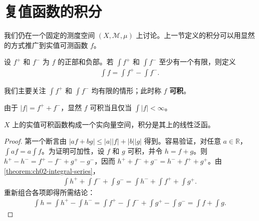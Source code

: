 \documentclass[../../main.tex]{subfiles}%
\begin{document}
\section{复值函数的积分}\label{section:ch02-complex-integration}
我们仍在一个固定的测度空间 $(X,\mathscr{M},\mu)$ 上讨论。上一节定义的积分可以用显然的方式推广到实值可测函数 $f$。
\begin{definition}[实值函数的积分]\label{definition:ch02-real-integral}
设 $f^+$ 和 $f^-$ 为 $f$ 的正部和负部。若 $\int f^+$ 和 $\int f^-$ 至少有一个有限，则定义
\begin{align*}
\int f=\int f^+-\int f^-.
\end{align*}
\end{definition}
\begin{definition}[实值可积函数]\label{definition:ch02-real-integrable}
我们主要关注 $\int f^+$ 和 $\int f^-$ 均有限的情形；此时称 $f$ \textbf{可积}。
\end{definition}
\begin{remark}
由于 $|f|=f^++f^-$，显然 $f$ 可积当且仅当 $\int|f|<\infty$。
\end{remark}
\begin{proposition}\label{proposition:ch02-real-integral-linearity}
$X$ 上的实值可积函数构成一个实向量空间，积分是其上的线性泛函。
\end{proposition}
\begin{proof}
第一个断言由 $|af+bg|\le|a||f|+|b||g|$ 得到。容易验证，对任意 $a\in\mathbb{R}$，$\int af=a\int f$。为证明可加性，设 $f$ 和 $g$ 可积，并令 $h=f+g$。则 $h^+-h^-=f^+-f^-+g^+-g^-$，因而 $h^++f^-+g^-=h^-+f^++g^+$。由\cref{theorem:ch02-integral-series}，
\begin{align*}
\int h^++\int f^-+\int g^-=\int h^-+\int f^++\int g^+.
\end{align*}
重新组合各项即得所需结论：
\begin{align*}
\int h=\int h^+-\int h^-=\int f^+-\int f^-+\int g^+-\int g^-=\int f+\int g.
\end{align*}
\end{proof}
\end{document}
